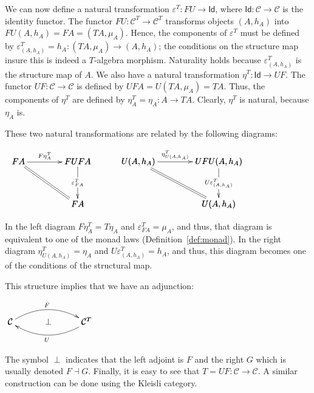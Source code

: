 \documentclass{article}
\let\mto\to
\let\to\relax
\newcommand{\to}{\rightarrow}
\newcommand{\cat}[1]{\mathcal{#1}}
\begin{document}
We can now define a natural transformation $\varepsilon^T : FU \mto
\mathsf{Id}$, where $\mathsf{Id} : \cat{C} \mto \cat{C}$ is the
identity functor.  The functor $FU : \cat{C}^T \mto \cat{C}^T$
transforms objects $(A,h_A)$ into $FU(A,h_A) = FA =
(TA,\mu_A)$. Hence, the components of $\varepsilon^T$ must be defined
by $\varepsilon^T_{(A,h_A)} = h_A : (TA, \mu_A) \mto (A, h_A)$; the
conditions on the structure map insure this is indeed a $T$-algebra
morphism.  Naturality holds because $\varepsilon^T_{(A,h_A)}$ is the
structure map of $A$.  We also have a natural transformation $\eta^T :
\mathsf{Id} \mto UF$.  The functor $UF : \cat{C} \mto \cat{C}$ is
defined by $UFA = U(TA,\mu_A) = TA$.  Thus, the components of $\eta^T$
are defined by $\eta^T_A = \eta_A : A \mto TA$.  Clearly, $\eta^T$ is
natural, because $\eta_A$ is.

These two natural transformations are related by the following diagrams:
\begin{center}
  \begin{math}
    \begin{array}{lll}
      \bfig
      \qtriangle|amm|/->`=`->/<700,500>[
        FA`
        FUFA`
        FA;
        F\eta^T_A``
        \varepsilon^T_{FA}]
      \efig
      & \quad &
      \bfig
      \qtriangle|amm|/->`=`->/<950,500>[
        U(A,h_A)`
        UFU(A,h_A)`
        U(A,h_A);
        \eta^T_{U(A,h_A)}``
        U\varepsilon^T_{(A,h_A)}]
      \efig
    \end{array}
  \end{math}
\end{center}
In the left diagram $F\eta^T_A = T\eta_A$ and $\varepsilon^T_{FA} =
\mu_A$, and thus, that diagram is equivalent to one of the monad laws
(Definition~\ref{def:monad}).  In the right diagram $\eta^T_{U(A,h_A)}
= \eta_A$ and $U\varepsilon^T_{(A,h_A)} = h_A$, and thus, this diagram
becomes one of the conditions of the structural map.

This structure implies that we have an adjunction:
\begin{center}
  \begin{math}
    \bfig
    \morphism(0,0)|a|/{@{>}@/^1.5em/}/<900,0>[\cat{C}`\cat{C}^T;F]
    \morphism(0,0)|b|/{@{<-}@/_1.5em/}/<900,0>[\cat{C}`\cat{C}^T;U]
    \place(450,0)[\perp]
    \efig
  \end{math}
\end{center}
The symbol $\perp$ indicates that the left adjoint is $F$ and the
right $G$ which is usually denoted $F \dashv G$.  Finally, it is easy
to see that $T = UF : \cat{C} \mto \cat{C}$.  A similar construction
can be done using the Kleisli category.
\end{document}
